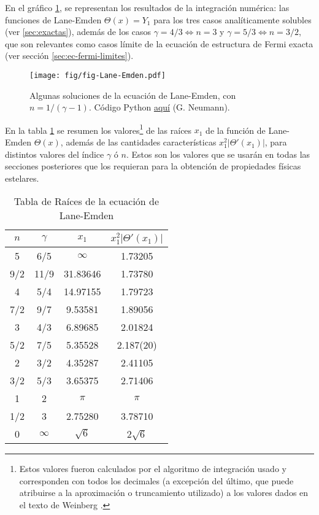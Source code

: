 En el gráfico \ref{graficolane-emden}, se representan los resultados de la integración numérica: las funciones de Lane-Emden $\Theta(x)=Y_1$ para los tres casos analíticamente solubles (ver \ref{sec:exactas}), además de los casos $\gamma=4/3\Leftrightarrow n=3$ y $\gamma=5/3\Leftrightarrow n=3/2$, que son relevantes como casos límite de la ecuación de estructura de Fermi exacta (ver sección \ref{sec:ec-fermi-limites}).
\begin{figure}[H]
\centering
\texttt{[image: fig/fig-Lane-Emden.pdf]}
\caption{Algunas soluciones de la ecuación de Lane-Emden, con $n=1/(\gamma-1)$. Código Python \href{https://github.com/gfrubi/GR/blob/master/figuras-editables/fig-Lane_Emden.py}{aquí} (G. Neumann).}
\label{graficolane-emden}
\end{figure}

En la tabla \ref{tablalaneemden} se resumen los valores\footnote{Estos valores fueron calculados por el algoritmo de integración usado y corresponden con todos los decimales (a excepción del último, que puede atribuirse a la aproximación o truncamiento utilizado) a los valores dados en el texto de Weinberg \cite{Weinberg72}.} de las raíces $x_1$ de la función de Lane-Emden $\Theta(x)$, además de las cantidades características $x_1^2\left|\Theta'(x_1)\right|$, para distintos valores del índice $\gamma$ ó $n$. Estos son los valores que se usarán en todas las secciones posteriores que los requieran para la obtención de propiedades físicas estelares.

\begin{table}[H]
\begin{center}
\caption{Tabla de Raíces de la ecuación de Lane-Emden}\label{tablalaneemden}
\vspace{2mm}
\begin{tabular}{|c|c|c|c|}\hline
$n$&$\gamma$ &$x_1$&$x_1^2\left|\Theta'(x_1)\right|$\\ \hline
5&6/5&$\infty$&1.73205\\
9/2&11/9&31.83646&1.73780\\
4&5/4&14.97155&1.79723\\
7/2&9/7&9.53581&1.89056\\
3&4/3&6.89685&2.01824\\
5/2&7/5&5.35528&2.187(20)\\
2&3/2&4.35287&2.41105\\
3/2&5/3&3.65375&2.71406\\
1&2&$\pi$&$\pi$\\
1/2&3&2.75280&3.78710\\
0&$\infty$&$\sqrt{6}$&2$\sqrt{6}$\\ \hline
\end{tabular}
\end{center}
\end{table}


